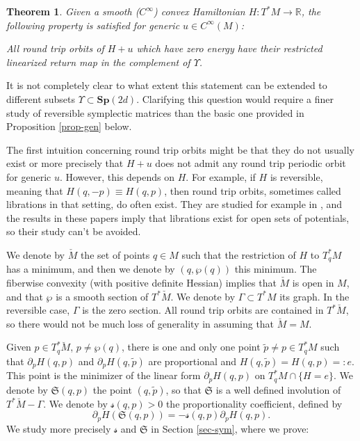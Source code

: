 \documentclass[10pt]{amsart}
\newcommand{\Rm}{\mathbb{R}}
\newcommand{\gS}{\ensuremath{\mathfrak{S}}}
\newcommand{\ms}{\ensuremath{\mathscr{s}}}
\newcommand{\Sp}{\mathbf{Sp}}
\theoremstyle{plain}
\newtheorem{thm}{Theorem}
\theoremstyle{definition}
\begin{document}
\begin{thm}\label{thm-g3}
Given a smooth ($C^{\infty}$) convex Hamiltonian $H: T^*M\rightarrow \Rm$,
the following property is satisfied for generic $u\in C^{\infty}(M)$:

All \emph{round trip}
orbits of $H+u$ which have zero energy have their restricted linearized
return map in the complement of $\Upsilon$.
\end{thm}

It is not completely clear to what extent this statement can be extended to different subsets $\Upsilon \subset \Sp(2d)$. Clarifying this question would require a finer study of reversible symplectic matrices than the basic one provided in Proposition \ref{prop-gen} below.

The first intuition concerning round trip orbits might be that they do not usually exist or more precisely that $H+u$ does not admit
any round trip periodic orbit for generic $u$. However, this depends on $H$. For example, if $H$ is reversible, meaning that
$H(q,-p)\equiv H(q,p)$, then round trip orbits, sometimes called librations in that setting, do often exist.
They are studied for example in \cite{BK,K76}, and the results in these papers imply that librations exist for open sets of potentials, so their study can't be avoided.

We denote by $\check M$ the set of points $q\in M$ such that the restriction of $H$ to $T^*_qM$ has a minimum,
and then we denote by $(q, \wp(q))$ this minimum. The fiberwise convexity (with positive definite Hessian) implies
that $\check M$ is open in $M$, and that $\wp$ is a smooth section of $T^*\check M$.
We denote by $\Gamma\subset T^*M$ its graph. In the reversible case, $\Gamma$ is the zero section.
All round trip orbits are contained in $T^*\breve M$, so there would not be much loss of generality in assuming that $\breve M=M$.

Given $p\in T^*_q\breve M$, $p\neq \wp(q)$, there is one and only one point
$\tilde p\neq p\in T^*_qM$ such that $\partial_pH(q,p)$ and $\partial_pH(q, \tilde p)$ are proportional and $H(q,\tilde p)=H(q,p)=:e$. This point is the minimizer of the linear form
$\partial_p H(q,p)$ on $T^*_qM\cap \{H= e\}$. We denote by $\gS(q,p)$ the point
$(q, \tilde p)$, so that $\gS$ is a well defined involution of $T^*\breve M-\Gamma$. We denote by $\ms(q,p)>0$ the proportionality coefficient, defined by
\[
\partial_pH(\gS(q,p))= -\ms(q,p)\partial_pH(q,p).
\]
We study more precisely $\ms$ and $\gS$ in Section \ref{sec-sym}, where we prove:
\end{document}
